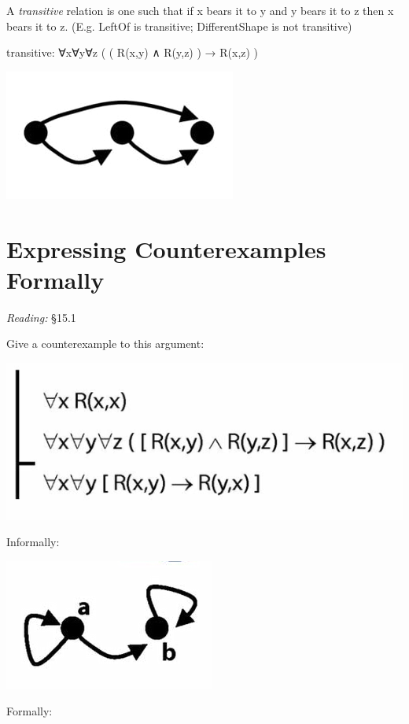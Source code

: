 \documentclass[12pt]{extarticle}
\begin{document}
\begin{multicols*}{3}
\begin{minipage}{\columnwidth}
 
A \emph{transitive} relation is one such that if x bears it to y and y bears it to z then x bears it to z. (E.g. LeftOf is transitive; DifferentShape is not transitive)
 
transitive: ∀x∀y∀z ( ( R(x,y) ∧ R(y,z) ) → R(x,z) )
 
\begin{center}
\includegraphics[scale=0.3]{img/transitive.png}
\end{center}
\end{minipage}
 
 
 
\section{Expressing Counterexamples Formally}
 
\emph{Reading:} §15.1
 
Give a counterexample to this argument:
 
\begin{center}
\includegraphics[scale=0.3]{img/unit_583_argument.png}
\end{center}
Informally:
 
\begin{center}
\includegraphics[scale=0.3]{img/unit_583_counterexample.png}
\end{center}
Formally:
 

\end{multicols*}
\end{document}
